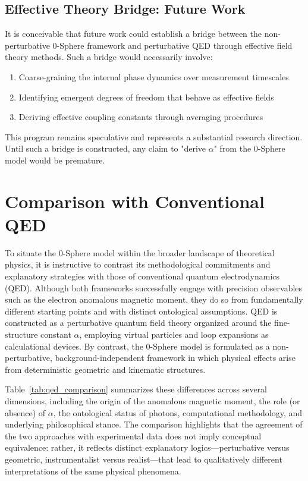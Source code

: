 \documentclass[12pt,letterpaper]{article}
\begin{document}
\subsection{Effective Theory Bridge: Future Work}

It is conceivable that future work could establish a bridge between the non-perturbative 0-Sphere framework and perturbative QED through effective field theory methods. Such a bridge would necessarily involve:
\begin{enumerate}
\item Coarse-graining the internal phase dynamics over measurement timescales
\item Identifying emergent degrees of freedom that behave as effective fields
\item Deriving effective coupling constants through averaging procedures
\end{enumerate}

This program remains speculative and represents a substantial research direction. Until such a bridge is constructed, any claim to "derive $\alpha$" from the 0-Sphere model would be premature.


\section{Comparison with Conventional QED}

To situate the 0-Sphere model within the broader landscape of theoretical physics, it is instructive to contrast its methodological commitments and explanatory strategies with those of conventional quantum electrodynamics (QED). 
Although both frameworks successfully engage with precision observables such as the electron anomalous magnetic moment, they do so from fundamentally different starting points and with distinct ontological assumptions. 
QED is constructed as a perturbative quantum field theory organized around the fine-structure constant $\alpha$, employing virtual particles and loop expansions as calculational devices. 
By contrast, the 0-Sphere model is formulated as a non-perturbative, background-independent framework in which physical effects arise from deterministic geometric and kinematic structures.

Table~\ref{tab:qed_comparison} summarizes these differences across several dimensions, including the origin of the anomalous magnetic moment, the role (or absence) of $\alpha$, the ontological status of photons, computational methodology, and underlying philosophical stance. 
The comparison highlights that the agreement of the two approaches with experimental data does not imply conceptual equivalence: rather, it reflects distinct explanatory logics—perturbative versus geometric, instrumentalist versus realist—that lead to qualitatively different interpretations of the same physical phenomena.
\end{document}
